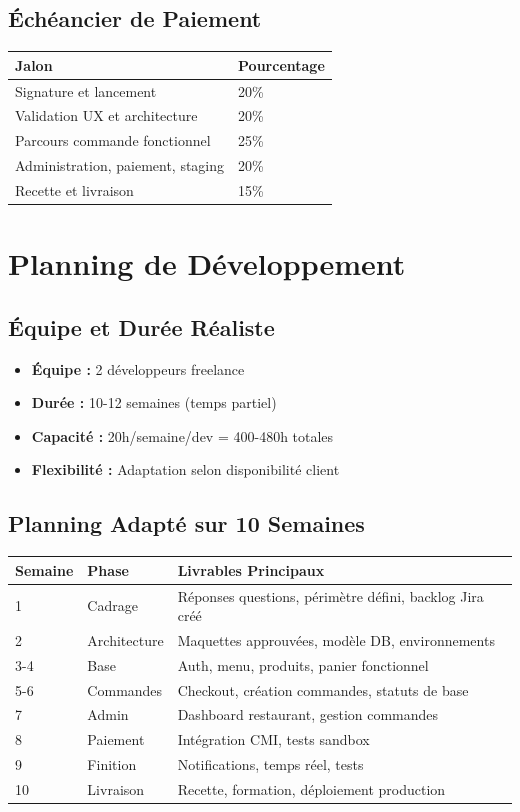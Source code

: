 \documentclass[11pt,a4paper]{article}
\begin{document}
\subsection{Échéancier de Paiement}

\begin{longtable}{|p{6cm}|p{3cm}|}
\hline
\textbf{Jalon} & \textbf{Pourcentage} \\
\hline
Signature et lancement & 20\% \\
\hline
Validation UX et architecture & 20\% \\
\hline
Parcours commande fonctionnel & 25\% \\
\hline
Administration, paiement, staging & 20\% \\
\hline
Recette et livraison & 15\% \\
\hline
\end{longtable}

\section{Planning de Développement}

\subsection{Équipe et Durée Réaliste}

\begin{itemize}
    \item \textbf{Équipe :} 2 développeurs freelance
    \item \textbf{Durée :} 10-12 semaines (temps partiel)
    \item \textbf{Capacité :} 20h/semaine/dev = 400-480h totales
    \item \textbf{Flexibilité :} Adaptation selon disponibilité client
\end{itemize}

\subsection{Planning Adapté sur 10 Semaines}

\begin{longtable}{|p{2cm}|p{3cm}|p{9cm}|}
\hline
\textbf{Semaine} & \textbf{Phase} & \textbf{Livrables Principaux} \\
\hline
1 & Cadrage & Réponses questions, périmètre défini, backlog Jira créé \\
\hline
2 & Architecture & Maquettes approuvées, modèle DB, environnements \\
\hline
3-4 & Base & Auth, menu, produits, panier fonctionnel \\
\hline
5-6 & Commandes & Checkout, création commandes, statuts de base \\
\hline
7 & Admin & Dashboard restaurant, gestion commandes \\
\hline
8 & Paiement & Intégration CMI, tests sandbox \\
\hline
9 & Finition & Notifications, temps réel, tests \\
\hline
10 & Livraison & Recette, formation, déploiement production \\
\hline
\end{longtable}
\end{document}

